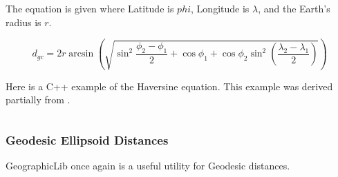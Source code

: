 The equation is given where Latitude is $phi$, Longitude is $\lambda$, and the Earth's radius is $r$.

\begin{equation}
d_{gc} = 2r \arcsin \left( \sqrt{ \sin^2 \frac{\phi_2 - \phi_1}{2} + \cos{\phi_1} + \cos{\phi_2} \sin^2 \left( \frac{\lambda_2 - \lambda_1}{2} \right) }  \right)
\end{equation}

Here is a C++ example of the Haversine equation. This example was derived partially from \cite[p. 109]{Meyer_Book}.
\inputminted{C++}{../code/chapter3/great-circle-distance.cpp}

\subsubsection*{Geodesic Ellipsoid Distances}


GeographicLib once again is a useful utility for Geodesic distances.  

\inputminted{C++}{../code/chapter3/geographiclib-ellipsoid-distance.cpp}

